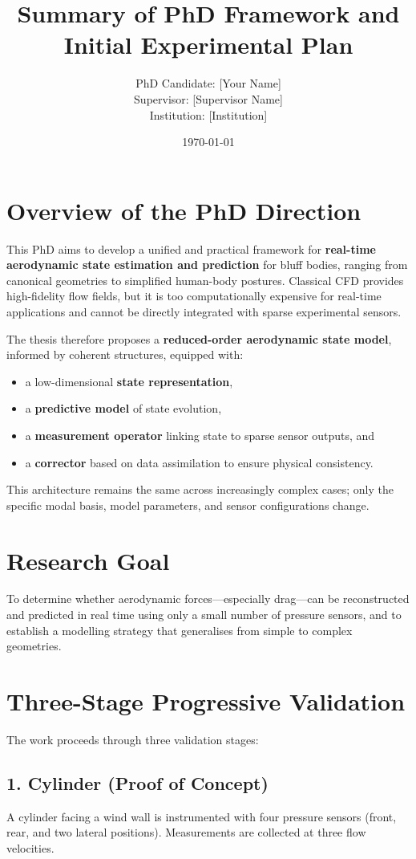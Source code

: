 \documentclass[12pt]{article}
\title{\textbf{Summary of PhD Framework and Initial Experimental Plan}}
\author{PhD Candidate: [Your Name] \\ Supervisor: [Supervisor Name] \\ Institution: [Institution]}
\date{\today}
\begin{document}

\section{Overview of the PhD Direction}
This PhD aims to develop a unified and practical framework for \textbf{real-time aerodynamic state estimation and prediction} for bluff bodies, ranging from canonical geometries to simplified human-body postures. Classical CFD provides high-fidelity flow fields, but it is too computationally expensive for real-time applications and cannot be directly integrated with sparse experimental sensors.

The thesis therefore proposes a \textbf{reduced-order aerodynamic state model}, informed by coherent structures, equipped with:
\begin{itemize}
    \item a low-dimensional \textbf{state representation},
    \item a \textbf{predictive model} of state evolution,
    \item a \textbf{measurement operator} linking state to sparse sensor outputs, and
    \item a \textbf{corrector} based on data assimilation to ensure physical consistency.
\end{itemize}

This architecture remains the same across increasingly complex cases; only the specific modal basis, model parameters, and sensor configurations change.

\section{Research Goal}
To determine whether aerodynamic forces---especially drag---can be reconstructed and predicted in real time using only a small number of pressure sensors, and to establish a modelling strategy that generalises from simple to complex geometries.

\section{Three-Stage Progressive Validation}
The work proceeds through three validation stages:

\subsection*{1. Cylinder (Proof of Concept)}
A cylinder facing a wind wall is instrumented with four pressure sensors (front, rear, and two lateral positions). Measurements are collected at three flow velocities.
\end{document}
